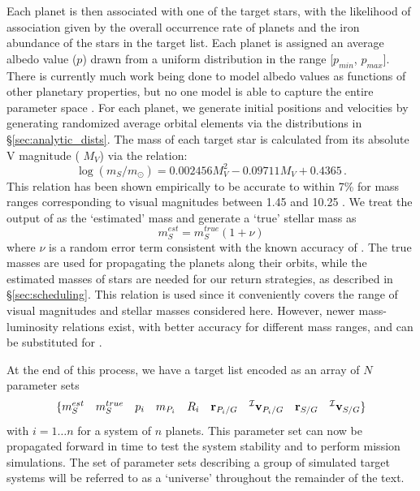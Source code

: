 Each planet is then associated with one of the target stars, with the likelihood of association given by the overall occurrence rate of planets and the iron abundance of the stars in the target list. Each planet is assigned an average albedo value ($p$) drawn from a uniform distribution in the range [$p_{min}$, $p_{max}$].  There is currently much work being done to model albedo values as functions of other planetary properties, but no one model is able to capture the entire parameter space \citep{sudarsky2005}.  For each planet, we generate initial positions and velocities by generating randomized average orbital elements via the distributions in \S\ref{sec:analytic_dists}. The mass of each target star is calculated from its absolute V magnitude ( $M_V$) via the relation:
\begin{equation}\label{eq:lmr}
\log(m_S/m_\odot) = 0.002456M_V^2 - 0.09711M_V + 0.4365 \,.
\end{equation}
 This relation has been shown empirically to be accurate to within 7\% for mass ranges corresponding to visual magnitudes between 1.45 and 10.25 \citep{henry1993}.  We treat the output of  as the `estimated' mass and generate a `true' stellar mass as
\begin{equation}
m_S^{est} = m_S^{true}(1+ \nu)
\end{equation}
where $\nu$ is a random error term consistent with the known accuracy of .  The true masses are used for propagating the planets along their orbits, while the estimated masses of stars are needed for our return strategies, as described in \S\ref{sec:scheduling}.  This relation is used since it conveniently covers the range of visual magnitudes and stellar masses considered here.  However, newer mass-luminosity relations exist, with better accuracy for different mass ranges, and can be substituted for  \citep{reid2002}.

At the end of this process, we have a target list encoded as an array of $N$ parameter sets
\begin{equation}\label{eq:simParamSet}
\{\begin{matrix} m_S^{est} &m_S^{true} & p_i & m_{P_i} & R_i & \mathbf r_{P_i/G} &  {}^\mathcal I \mathbf v_{P_i/G}& \mathbf r_{S/G} &  {}^\mathcal I \mathbf v_{S/G} \end{matrix} \}
\end{equation}
with $i = 1 \ldots n$ for a system of $n$ planets.  This parameter set can now be propagated forward in time to test the system stability and to perform mission simulations.  The set of parameter sets describing a group of simulated target systems will be referred to as a `universe' throughout the remainder of the text.

